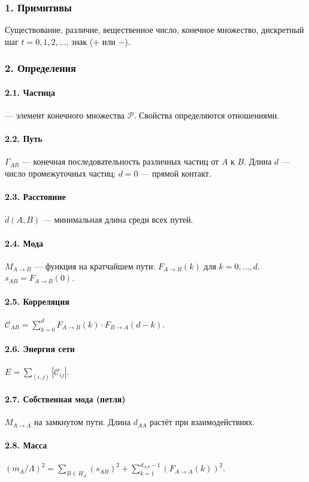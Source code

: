 \documentclass[12pt,a4paper]{article}
\begin{document}
\subsubsection{1. Примитивы}
Существование, различие, вещественное число, конечное множество, дискретный шаг $t = 0, 1, 2, \dots$, знак ($+$ или $-$).

\subsubsection{2. Определения}

\paragraph{2.1. Частица} --- элемент конечного множества $\mathcal{P}$. Свойства определяются отношениями.
\paragraph{2.2. Путь} $\Gamma_{AB}$ --- конечная последовательность различных частиц от $A$ к $B$. Длина $d$ --- число промежуточных частиц; $d=0$ --- прямой контакт.
\paragraph{2.3. Расстояние} $d(A,B)$ --- минимальная длина среди всех путей.
\paragraph{2.4. Мода} $M_{A \to B}$ --- функция на кратчайшем пути: $F_{A \to B}(k)$ для $k=0,\dots,d$. $s_{AB} = F_{A \to B}(0)$.
\paragraph{2.5. Корреляция} $\mathcal{C}_{AB} = \sum_{k=0}^{d} F_{A \to B}(k) \cdot F_{B \to A}(d-k)$.
\paragraph{2.6. Энергия сети} $E = \sum_{(i,j)} |\mathcal{C}_{ij}|$.
\paragraph{2.7. Собственная мода (петля)} $M_{A \to A}$ на замкнутом пути. Длина $d_{AA}$ растёт при взаимодействиях.
\paragraph{2.8. Масса} $(m_A/\Lambda)^2 = \sum_{B \in H_A} (s_{AB})^2 + \sum_{k=1}^{d_{AA}-1} (F_{A \to A}(k))^2$.
\end{document}

